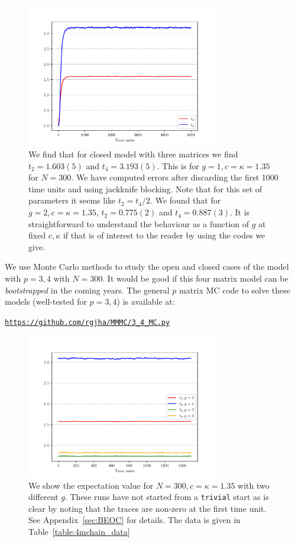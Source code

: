 \documentclass[11pt]{article}
\begin{document}
\begin{figure}[htbp] 
	\centering 
	\includegraphics[width=0.75\textwidth]{figs/3MM_closed.pdf}
	\caption{\label{fig:3MM_closed}We find that for closed model with three matrices we find $t_{2} = 1.603(5)$ and $t_{4} = 3.193(5)$. 
	This is for $g=1, c=\kappa=1.35$ for $N=300$. We have computed errors after discarding the first 1000 time units and 
	using jackknife blocking. Note that for this set of parameters it seems like $t_{2} = t_{4}/2$. We found that 
	for $g=2, c=\kappa=1.35$, $t_{2} = 0.775(2)$ and $t_{4} = 0.887(3)$. It is straightforward to understand the behaviour as a function of $g$ at fixed $c, \kappa$ if that is of interest to the reader by using the codes we give.}
\end{figure}
We use Monte Carlo methods to study the open and closed cases of the model with $p = 3,4$ with 
$N = 300$. It would be good if this four matrix model can be \textit{bootstrapped} in the coming years. 
The general $p$ matrix MC code to solve these models 
(well-tested for $p = 3,4$) is available at: 
\begin{center} \texttt{\href{https://github.com/rgjha/MMMC/3\_4\ _MC.py}{https://github.com/rgjha/MMMC/3\_4\_MC.py}} \end{center}

\begin{figure}[htbp] 
	\centering 
	\includegraphics[width=0.75\textwidth]{figs/4MM_g1_g2.pdf}
\caption{\label{fig:4MM_closed1} We show the expectation value for $N=300, c=\kappa=1.35$ with two different $g$. These runs have not started from a \texttt{trivial} start
	as is clear by noting that the traces are non-zero at the first time unit. See Appendix~\ref{sec:BEOC} for details. The data is given in Table~\ref{table:4mchain_data}}
\end{figure}
\end{document}
